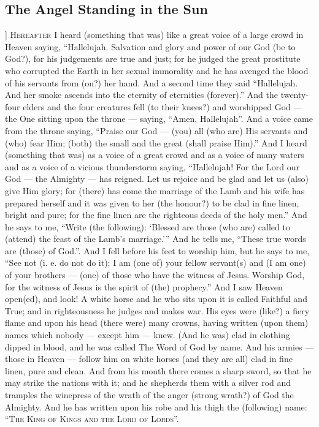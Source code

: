 \begin{pages}
\begin{Leftside}
        			\chapter{The Angel Standing in the Sun}
				]		
		\renewcommand{\LettrineFontHook}{\Zallmanfamily}
		\lettrine[lines=3]{H}{ereafter} I heard (something that was) like a great voice of a large crowd in Heaven saying, “Hallelujah. Salvation and glory and power of our God (be to God?), for his judgements are true and just; for he judged the great prostitute who corrupted the Earth in her sexual immorality and he has avenged the blood of his servants from (on?) her hand. 
		\pend
		\pstart
		And a second time they said “Hallelujah. And her smoke ascends into the eternity of eternities (forever).” And the twenty-four elders and the four creatures fell (to their knees?) and worshipped God — the One sitting upon the throne — saying, “Amen, Hallelujah”. And a voice came from the throne saying, “Praise our God — (you) all (who are) His servants and (who) fear Him; (both) the small and the great (shall praise Him).”
		\pend
		\pstart
		And I heard (something that was) as a voice of a great crowd and as a voice of many waters and as a voice of a vicious thunderstorm saying, “Hallelujah! For the Lord our God — the Almighty — has reigned. Let us rejoice and be glad and let us (also) give Him glory; for (there) has come the marriage of the Lamb and his wife has prepared herself and it was given to her (the honour?) to be clad in fine linen, bright and pure; for the fine linen are the righteous deeds of the holy men.” 
		\pend
		\pstart
		And he says to me, “Write (the following): ‘Blessed are those (who are) called to (attend) the feast of the Lamb’s marriage.’” And he tells me, “These true words are (those) of God.”. And I fell before his feet to worship him, but he says to me, “See not (i. e. do not do it); I am (one of) your fellow servant(s) and (I am one) of your brothers — (one) of those who have the witness of Jesus. Worship God, for the witness of Jesus is the spirit of (the) prophecy.”
		\pend
		\pstart
		And I saw Heaven open(ed), and look! A white horse and he who sits upon it is called Faithful and True; and in righteousness he judges and makes war. His eyes were (like?) a fiery flame and upon his head (there were) many crowns, having written (upon them) names which nobody — except him — knew. (And he was) clad in clothing dipped in blood, and he was called The Word of God by name. And his armies — those in Heaven — follow him on white horses (and they are all) clad in fine linen, pure and clean. And from his mouth there comes a sharp sword, so that he may strike the nations with it; and he shepherds them with a silver rod and tramples the winepress of the wrath of the anger (strong wrath?) of God the Almighty. And he has written upon his robe and his thigh the (following) name: “\textsc{The King of Kings and the Lord of Lords}”.

\end{Leftside}
\end{pages}
